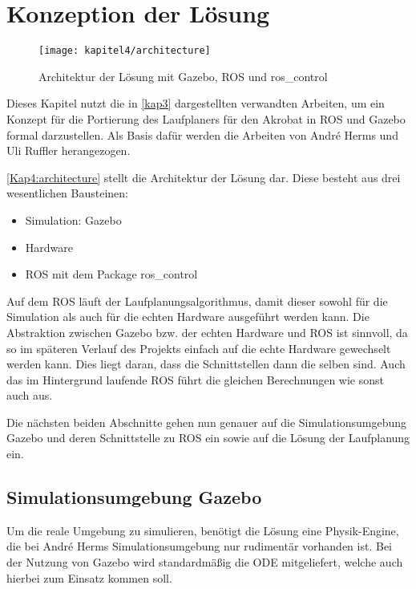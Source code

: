\chapter{Konzeption der Lösung}
\label{kap4}

\begin{figure}[b!]
  \centering
  \texttt{[image: kapitel4/architecture]}
  \caption{Architektur der Lösung mit Gazebo, \ac{ROS} und ros\_control}
  \label{Kap4:architecture}
\end{figure}

Dieses Kapitel nutzt die in \autoref{kap3} dargestellten verwandten Arbeiten, um ein Konzept für die Portierung des Laufplaners für den Akrobat in \ac{ROS} und Gazebo formal darzustellen. Als Basis dafür werden die Arbeiten von André Herms \autocite{herms2004} und Uli Ruffler \autocite{ruffler2006} herangezogen.

\autoref{Kap4:architecture} stellt die Architektur der Lösung dar. Diese besteht aus drei wesentlichen Bausteinen:
\begin{itemize}
\item Simulation: Gazebo
\item Hardware
\item \ac{ROS} mit dem Package ros\_control
\end{itemize}

Auf dem \ac{ROS} läuft der Laufplanungsalgorithmus, damit dieser sowohl für die Simulation als auch für die echten Hardware ausgeführt werden kann. Die Abstraktion zwischen Gazebo bzw. der echten Hardware und \ac{ROS} ist sinnvoll, da so im späteren Verlauf des Projekts einfach auf die echte Hardware gewechselt werden kann. Dies liegt daran, dass die Schnittstellen dann die selben sind. Auch das im Hintergrund laufende \ac{ROS} führt die gleichen Berechnungen wie sonst auch aus.

Die nächsten beiden Abschnitte gehen nun genauer auf die Simulationsumgebung Gazebo und deren Schnittstelle zu \ac{ROS} ein sowie auf die Lösung der Laufplanung ein.

\section{Simulationsumgebung Gazebo} 

Um die reale Umgebung zu simulieren, benötigt die Lösung eine Physik-Engine, die bei André Herms \autocite{herms2004} Simulationsumgebung nur rudimentär vorhanden ist. Bei der Nutzung von Gazebo wird standardmäßig die \acf{ODE} mitgeliefert, welche auch hierbei zum Einsatz kommen soll.

